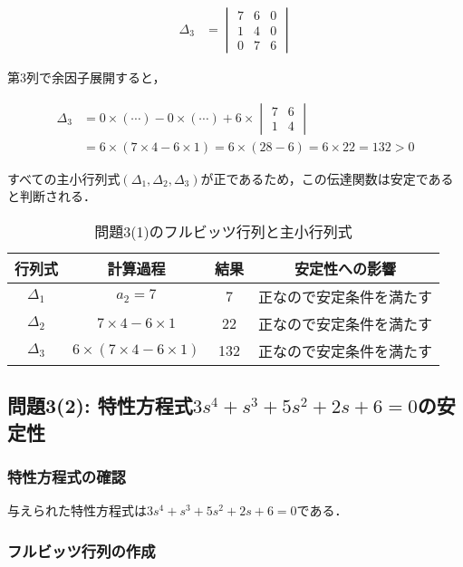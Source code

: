 \documentclass[11pt,a4paper]{ltjsarticle}
\begin{document}
\begin{align}
\Delta_3 &= \begin{vmatrix}
7 & 6 & 0 \\
1 & 4 & 0 \\
0 & 7 & 6
\end{vmatrix}
\end{align}

第3列で余因子展開すると，

\begin{align}
\Delta_3 &= 0 \times (\cdots) - 0 \times (\cdots) + 6 \times \begin{vmatrix}
7 & 6 \\
1 & 4
\end{vmatrix} \\
&= 6 \times (7 \times 4 - 6 \times 1) = 6 \times (28 - 6) = 6 \times 22 = 132 > 0
\end{align}

すべての主小行列式$(\Delta_1, \Delta_2, \Delta_3)$が正であるため，この伝達関数は安定であると判断される．

\begin{table}[h]
\centering
\caption{問題3(1)のフルビッツ行列と主小行列式}
\label{tbl:hurwitz1}
\begin{tabular}{cccc}
\toprule
行列式 & 計算過程 & 結果 & 安定性への影響 \\
\midrule
$\Delta_1$ & $a_2 = 7$ & 7 & 正なので安定条件を満たす \\
$\Delta_2$ & $7 \times 4 - 6 \times 1$ & 22 & 正なので安定条件を満たす \\
$\Delta_3$ & $6 \times (7 \times 4 - 6 \times 1)$ & 132 & 正なので安定条件を満たす \\
\bottomrule
\end{tabular}
\end{table}

\subsection{問題3(2): 特性方程式$3s^4+s^3+5s^2+2s+6=0$の安定性}

\subsubsection{特性方程式の確認}

与えられた特性方程式は$3s^4+s^3+5s^2+2s+6=0$である．

\subsubsection{フルビッツ行列の作成}
\end{document}
